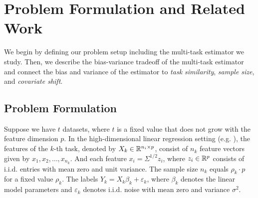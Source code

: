 \section{Problem Formulation and Related Work}
\label{sec_prelim}

We begin by defining our problem setup including the multi-task estimator we study.
Then, we describe the bias-variance tradeoff of the multi-task estimator and connect the bias and variance of the estimator to \textit{task similarity}, \textit{sample size}, and \textit{covariate shift}.

\subsection{Problem Formulation}

Suppose we have $t$ datasets, where $t$ is a fixed value that does not grow with the feature dimension $p$.
In the high-dimensional linear regression setting (e.g. \cite{HMRT19,BLLT20}), the features of the $k$-th task, denoted by $X_k\in\mathbb{R}^{n_i\times p}$, consist of $n_k$ feature vectors given by $x_1, x_2, \dots, x_{n_k}$.
And each feature $x_i = \Sigma^{1/2}z_i$, where $z_i\in\mathbb{R}^p$ consists of i.i.d. entries with mean zero and unit variance.
The sample size $n_k $ equals $\rho_k\cdot p$ for a fixed value $\rho_k$.
The labels $Y_k = X_k \beta_k + \varepsilon_k$, where $\beta_k$ denotes the linear model parameters and $\varepsilon_k$ denotes i.i.d. noise with mean zero and variance $\sigma^2$.

